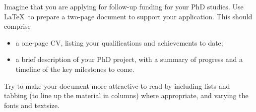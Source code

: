 \documentclass[12pt]{article}
\begin{document}
\newpage
\begin{center}
\end{center}
Imagine that you are applying for follow-up funding for your PhD studies. 
Use \LaTeX\, to prepare a two-page document to support your application. 
This should comprise
\begin{itemize}
\item a one-page CV, listing  your qualifications and achievements to date;
\item a brief description of your PhD project, with a summary of progress and a 
timeline of the key milestones to come.
\end{itemize}
Try to make your document more attractive to read by including lists and
tabbing (to line up the material in columns) where appropriate, and varying the 
fonts and textsize.
\end{document}
